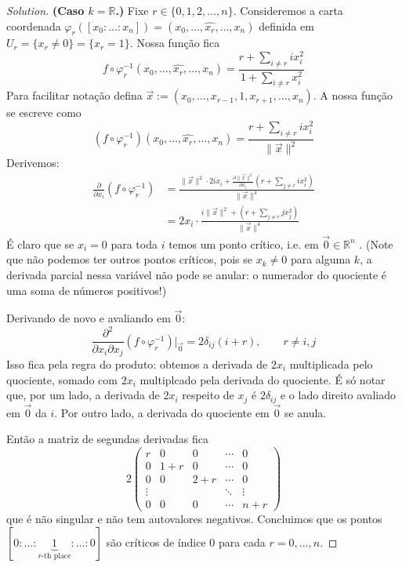 \begin{proof}[Solution]\leavevmode
	\textbf{(Caso \(k=\mathbb{R}\).)} Fixe \(r \in \{0,1,2,\ldots,n\}\). Consideremos a carta coordenada \(\varphi_r([x_0:\ldots:x_n])	= (x_0,\ldots,\widehat{x_r},\ldots,x_n)\) definida em \(U_r=\{x_r \neq 0\}=\{x_r=1\}\). Nossa função fica
	\[f \circ \varphi_r^{-1}(x_0,\ldots,\widehat{x_r},\ldots,x_n)=\frac{r+\sum_{i\neq r}ix_i^2}{1+\sum_{i\neq r}x_i^2}\]
Para facilitar notação defina \(\vec{x}:=(x_0,\ldots,x_{r-1},1,x_{r+1},\ldots,x_n)\). A nossa função se escreve como
\[(f \circ \varphi_r^{-1})(x_0,\ldots,\widehat{x_r},\ldots,x_n)=\frac{r+\sum_{i\neq r}ix_i^2}{\|\vec{x}\|^2}\]
Derivemos:
\begin{align*}
\frac{\partial }{\partial x_i}(f \circ \varphi_r^{-1})&=\frac{\|\vec{x}\|^2\cdot 2ix_i+\frac{\partial \|\vec{x}\|^2}{\partial x_i}\left(r+\sum_{j \neq r}ix_i^2\right) }{\|\vec{x}\|^4}\\
&=2x_i\cdot  \frac{i \|\vec{x}\|^2+\left(r+\sum_{j \neq r}jx_j^2\right) }{\|\vec{x}\|^4}
\end{align*}
É claro que se \(x_i=0\) para toda \(i\) temos um ponto crítico, i.e. em \(\vec{0}\in \mathbb{R}^n\)%
. (Note que não podemos ter outros pontos críticos, pois se \(x_k \neq 0\) para alguma \(k\), a derivada parcial nessa variável não pode se anular: o numerador do quociente é uma soma de números positivos!)


Derivando de novo e avaliando em \(\vec{0}\):
\[\frac{\partial ^2}{\partial x_i\partial x_j}(f \circ \varphi_r^{-1})\Big|_{\vec{0}}=2\delta_{ij}(i+r),\qquad r \neq  i,j\]
Isso fica pela regra do produto: obtemos a derivada de \(2x_i\) multiplicada pelo quociente, somado com \(2x_i\) multiplcado pela derivada do quociente. É só notar que, por um lado, a derivada de \(2x_i\) respeito de \(x_j\) é \(2\delta_{ij}\) e o lado direito avaliado em \(\vec{0}\) da \(i\). Por outro lado, a derivada do quociente em \(\vec{0}\) se anula.

Então a matriz de segundas derivadas fica
\[2\begin{pmatrix} r & 0 &0 & \cdots &0\\
0 & 1+r & 0& \cdots & 0\\
0 & 0 & 2+r & \cdots & 0\\
\vdots & & &\ddots &\vdots \\
0 & 0 & 0 & \cdots & n+r\end{pmatrix}\]
que é não singular e não tem autovalores negativos. Concluimos que os pontos \([0:\ldots:\underbrace{1}_{r\text{-th place} }:\ldots:0]\) são críticos de índice 0 para cada \(r=0,\ldots,n\).


\end{proof}
